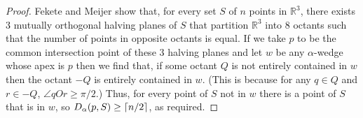 \documentclass{dmtcs}
\newcommand{\R}{\mathbb{R}}
\begin{document}
\begin{proof}
Fekete and Meijer \cite{fm00} show that, for every set $S$ of $n$
points in $\R^3$, there exists 3 mutually orthogonal
halving planes of $S$ that partition $\R^3$ into 8 octants such that the
number of points in opposite octants is equal.  If we take $p$ to be
the common intersection point of these 3 halving planes and let $w$ be
any $\alpha$-wedge whose apex is $p$ then we find that, if some octant
$Q$ is not entirely contained in $w$ then the octant $-Q$ is entirely
contained in $w$.  (This is because for any $q\in Q$ and $r\in-Q$,
$\angle qOr\ge \pi/2$.) Thus, for every point of $S$ not in $w$ there
is a point of $S$ that is in $w$, so $D_\alpha(p,S)\ge \left\lceil n/2 \right\rceil$, as
required. 
\end{proof}


\end{document}
